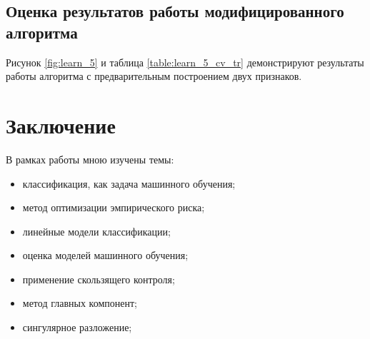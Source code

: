 \documentclass[%
bachelor,    %
subf,        %
href,        %
colorlinks,  %
]{disser}
\begin{document}
\subsection{Оценка результатов работы модифицированного алгоритма}
Рисунок \ref{fig:learn_5} и таблица \ref{table:learn_5_cv_tr} демонстрируют результаты работы алгоритма с предварительным построением двух признаков.
\section{Заключение}
В рамках работы мною изучены темы:\begin{itemize}
	\item классификация, как задача машинного обучения;
	\item метод оптимизации эмпирического риска;
	\item линейные модели классификации;
	\item оценка моделей машинного обучения;
	\item применение скользящего контроля;
	\item метод главных компонент;
	\item сингулярное разложение;
\end{itemize}


\printbibliography[heading=bibintoc]

\appendix
\end{document}
